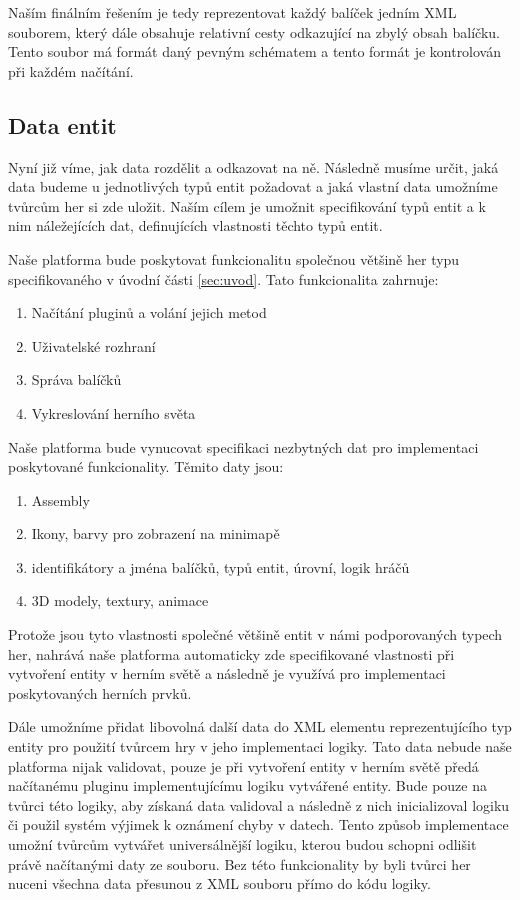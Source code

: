 Naším finálním řešením je tedy reprezentovat každý balíček jedním XML souborem, který dále obsahuje relativní cesty odkazující na zbylý obsah balíčku. Tento soubor má formát daný pevným schématem a tento formát je kontrolován při každém načítání. 

\subsection{Data entit}
Nyní již víme, jak data rozdělit a odkazovat na ně. Následně musíme určit, jaká data budeme u jednotlivých typů entit požadovat a jaká vlastní data umožníme tvůrcům her si zde uložit. Naším cílem je umožnit specifikování typů entit a k nim náležejících dat, definujících vlastnosti těchto typů entit. 

Naše platforma bude poskytovat funkcionalitu společnou většině her typu specifikovaného v úvodní části \ref{sec:uvod}. 
Tato funkcionalita zahrnuje:
\begin{enumerate}
	\item Načítání pluginů a volání jejich metod
	\item Uživatelské rozhraní
	\item Správa balíčků
	\item Vykreslování herního světa
\end{enumerate} 

Naše platforma bude vynucovat specifikaci nezbytných dat pro implementaci poskytované funkcionality. Těmito daty jsou:
\begin{enumerate}
	\item Assembly
	\item Ikony, barvy pro zobrazení na minimapě
	\item identifikátory a jména balíčků, typů entit, úrovní, logik hráčů
	\item 3D modely, textury, animace
\end{enumerate}
Protože jsou tyto vlastnosti společné většině entit v námi podporovaných typech her, nahrává naše platforma automaticky zde specifikované vlastnosti při vytvoření entity v herním světě a následně je využívá pro implementaci poskytovaných herních prvků.

Dále umožníme přidat libovolná další data do XML elementu reprezentujícího typ entity pro použití tvůrcem hry v jeho implementaci logiky. Tato data nebude naše platforma nijak validovat, pouze je při vytvoření entity v herním světě předá načítanému pluginu implementujícímu logiku vytvářené entity. Bude pouze na tvůrci této logiky, aby získaná data validoval a následně z nich inicializoval logiku či použil systém výjimek k oznámení chyby v datech. Tento způsob implementace umožní tvůrcům vytvářet universálnější logiku, kterou budou schopni odlišit právě načítanými daty ze souboru. Bez této funkcionality by byli tvůrci her nuceni všechna data přesunou z XML souboru přímo do kódu logiky.

